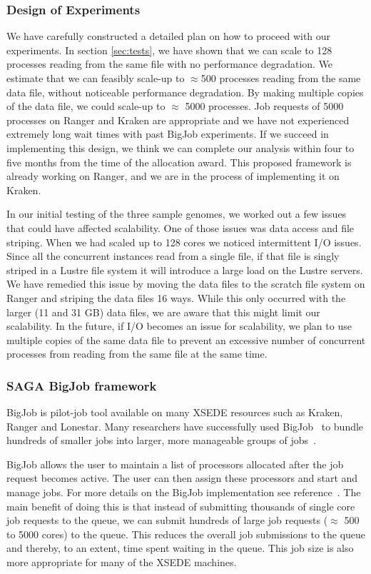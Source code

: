 \documentclass{sig-alternate}
\begin{document}
\subsubsection{Design of Experiments}
We have carefully constructed a detailed plan on how to proceed with our experiments. In section \ref{sec:tests}, we have shown that we can scale to 128 processes reading from the same file with no performance degradation. We estimate that we can feasibly scale-up to $\approx$500 processes reading from the same data file, without noticeable performance degradation. By making multiple copies of the data file, we could scale-up to $\approx$ 5000 processes. Job requests of 5000 processes on Ranger and Kraken are appropriate and we have not experienced extremely long wait times with past BigJob experiments. If we succeed in implementing this design, we think we can complete our analysis within four to five months from the time of the allocation award. This proposed framework is already working on Ranger, and we are in the process of implementing it on Kraken. 

In our initial testing of the three sample genomes, we worked out a few issues that could have affected
scalability. One of those issues was data access and file striping. When we had scaled up to 128 cores we
noticed intermittent I/O issues. Since all the concurrent instances read from a single file, if that file is
singly striped in a Lustre file system it will introduce a large load on the Lustre servers. We have remedied
this issue by moving the data files to the scratch file system on Ranger and striping the data files 16
ways. While this only occurred with the larger (11 and 31 GB) data files, we are aware that this might limit
our scalability. In the future, if I/O becomes an issue for scalability, we plan to use multiple copies of the
same data file to prevent an excessive number of concurrent processes from reading from the same file at the same time.

\subsubsection{SAGA BigJob framework}
\label{sec:bigjob}

BigJob is pilot-job tool available on many XSEDE resources such as Kraken, Ranger and Lonestar. Many researchers have successfully used BigJob~\cite{bigjob_web} to bundle hundreds of smaller jobs into larger, more manageable groups of jobs~\cite{Luckow:2008fp, async_repex11}. 

BigJob allows the user to maintain a list of processors allocated after the job request becomes active. The user can then assign these processors and start and manage jobs. For more details on the BigJob implementation see reference~\cite{saga_bigjob_condor_cloud}. The main benefit of doing this is that instead of submitting thousands of single core job requests to the queue, we can submit hundreds of large job requests ($\approx$ 500 to 5000 cores) to the queue. This reduces the overall job submissions to the queue and thereby, to an extent, time spent waiting in the queue. This job size is also more appropriate for many of the XSEDE machines. 
\end{document}
